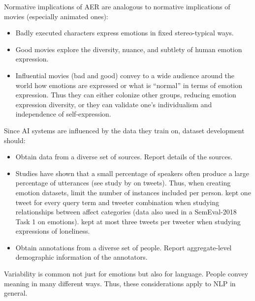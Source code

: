 \documentclass{clv3}
\begin{document}
Normative implications of AER are analogous to normative implications of movies (especially animated ones):\\[-20pt]
\begin{itemize}
    \item Badly executed characters express emotions in fixed stereo-typical ways.
    \item Good movies explore the diversity, nuance, and subtlety of human emotion expression.
    \item Influential movies (bad and good) convey to a wide audience around the world how emotions are expressed or what is “normal” in terms of emotion expression. Thus they can either colonize other groups, reducing emotion expression diversity, or they can validate one's individualism and independence of self-expression.
\end{itemize}
\vspace*{-3mm}
Since AI systems are  influenced by the data they train on, dataset development should:\\[-20pt]
\begin{itemize}
    \item Obtain data from a diverse set of sources. Report details of the sources.
    \vspace*{-1mm}
    \item Studies have shown that a small percentage of speakers often produce a large percentage of utterances (see study by \cite{auxier2021social} on tweets). Thus, when creating emotion datasets, limit the number of instances included per person. 
    \citet{mohammad-kiritchenko-2018-understanding} kept one tweet for every query term and tweeter combination when studying relationships between affect categories (data also used in a SemEval-2018 Task 1 on emotions). %
    \citet{kiritchenko-etal-2020-solo} kept at most three tweets per tweeter when studying expressions of loneliness.
    \vspace*{-1mm}
    \item Obtain annotations from a diverse set of people. Report aggregate-level demographic information of the annotators.
\end{itemize}
\vspace*{-3mm}
\noindent Variability is common not just for emotions but also for  language. People convey meaning in many different ways. %
Thus, these considerations apply to NLP in general.\\
\end{document}
